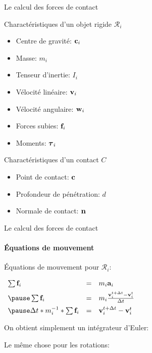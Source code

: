 \begin{frame}{Le calcul des forces de contact}
    \begin{block}{Charactéristiques d’un objet rigide $\mathcal{R}_i$}
    \begin{itemize}
        \item Centre de gravité: ${\bf c}_i$
        \item Masse:             $m_i$
        \item Tenseur d’inertie: $I_i$
        \item Vélocité linéaire: ${\bf v}_i$
        \item Vélocité angulaire: ${\bf w}_i$
        \item Forces subies: ${\bf f}_i$
        \item Moments: $\boldsymbol\tau_i$
    \end{itemize}
    \end{block}

    \pause

    \begin{block}{Charactéristiques d’un contact $C$}
    \begin{itemize}
        \item Point de contact: ${\bf c}$
        \item Profondeur de pénétration: $d$
        \item Normale de contact: ${\bf n}$
    \end{itemize}
    \end{block}
\end{frame}

\begin{frame}{Le calcul des forces de contact}
    \framesubtitle{Équations de mouvement}
    Équations de mouvement pour $\mathcal{R}_i$:\\
    \begin{center}
    \begin{math}
        \begin{array}{lcl}
            \sum \f_i & = & m_i\a_i \\[0.5em]
            \pause
            \sum \f_i & = & m_i \frac{\v_i^{t + \Delta t} - \v_i^t}{\Delta t} \\[0.5em]
            \pause
            \Delta t * m_i^{-1} * \sum \f_i & = & \v_i^{t + \Delta t} - \v_i^t
        \end{array}
    \end{math}
    \end{center}

    \pause
    On obtient simplement un intégrateur d’Euler:
    \begin{center}
    \end{center}
    \pause
    Le même chose pour les rotations:
    \begin{center}
    \end{center}
\end{frame}

